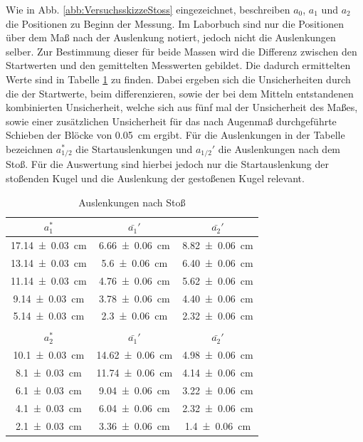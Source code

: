 			Wie in Abb. \ref{abb:VersuchsskizzeStoss} eingezeichnet, beschreiben $a_0$, $a_1$ und $a_2$  die Positionen zu Beginn der Messung. Im Laborbuch sind nur die Positionen über dem Maß nach der Auslenkung notiert, jedoch nicht die Auslenkungen selber. Zur Bestimmung dieser für beide Massen wird die Differenz zwischen den Startwerten und den gemittelten Messwerten gebildet. Die dadurch ermittelten Werte sind in Tabelle \ref{tab:Messwerte2} zu finden. Dabei ergeben sich die Unsicherheiten durch die der Startwerte, beim differenzieren, sowie der bei dem Mitteln entstandenen kombinierten Unsicherheit, welche sich aus fünf mal der Unsicherheit des Maßes, sowie einer zusätzlichen Unsicherheit für das nach Augenmaß durchgeführte Schieben der Blöcke von \SI{0,05}{\cm} ergibt. Für die Auslenkungen in der Tabelle bezeichnen $a_{1/2}^{*}$ die Startauslenkungen und $a_{1/2}'$ die Auslenkungen nach dem Stoß. Für die Auswertung sind hierbei jedoch nur die Startauslenkung der stoßenden Kugel und die Auslenkung der gestoßenen Kugel relevant. 	
			\begin{table}[ht]
				\caption{Auslenkungen nach Stoß}
				\centering
				\label{tab:Messwerte2}
	
				\begin{tabular}{c|c|c}
					{$a_{1}^{*}$} & {$\bar{a_{1}}'$} & {$\bar{a_{2}}'$}	\\
					\hline
					{\SI{17,14+-0,03}{\cm}} & {\SI{6,66+-0,06}{\cm}} & {\SI{8,82+-0,06}{\cm}}\\
					{\SI{13,14+-0,03}{\cm}} & {\SI{5,6+-0,06}{\cm}} & {\SI{6,40+-0,06}{\cm}}\\
					{\SI{11,14+-0,03}{\cm}} & {\SI{4,76+-0,06}{\cm}} & {\SI{5,62+-0,06}{\cm}}\\
					{\SI{9,14+-0,03}{\cm}} & {\SI{3,78+-0,06}{\cm}} & {\SI{4,40+-0,06}{\cm}}\\
					{\SI{5,14+-0,03}{\cm}} & {\SI{2,3+-0,06}{\cm}} & {\SI{2,32+-0,06}{\cm}}\\		
					\hline 
					& & \\
					{$a_{2}^{*}$} & {$\bar{a_{1}}'$} & {$\bar{a_{2}}'$}	\\
					\hline
					{\SI{10,1+-0,03}{\cm}} & {\SI{14,62+-0,06}{\cm}} & {\SI{4,98+-0,06}{\cm}}\\
					{\SI{8,1+-0,03}{\cm}} & {\SI{11,74+-0,06}{\cm}} & {\SI{4,14+-0,06}{\cm}}\\
					{\SI{6,1+-0,03}{\cm}} & {\SI{9,04+-0,06}{\cm}} & {\SI{3,22+-0,06}{\cm}}\\
					{\SI{4,1+-0,03}{\cm}} & {\SI{6,04+-0,06}{\cm}} & {\SI{2,32+-0,06}{\cm}}\\
					{\SI{2,1+-0,03}{\cm}} & {\SI{3,36+-0,06}{\cm}} & {\SI{1,4+-0,06}{\cm}}\\	
				\end{tabular}	
			\end{table}
	
